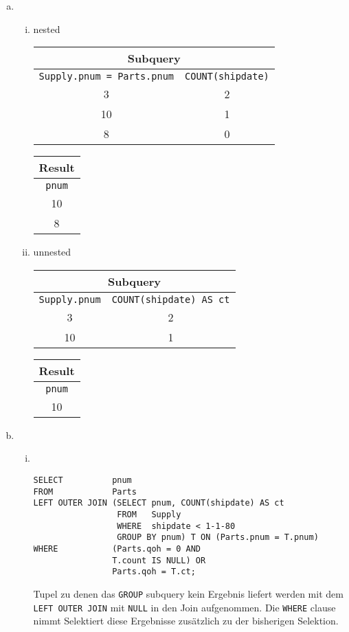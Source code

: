 \documentclass{uni_tue_template}
\newcommand{\code}[1]{\texttt{{\footnotesize #1}}}
\begin{document}
	\begin{enumerate}[(a)]
		\item \hfill\\
		\begin{enumerate}[i.]
			\item nested\\
			\begin{tabular}{|c|c|}
			\multicolumn{2}{c}{\textbf{Subquery}}\\
			\hline
			\code{Supply.pnum = Parts.pnum}&\code{COUNT(shipdate)}\\
			\hline
			3&2\\
			10&1\\
			8&0\\
			\hline
			\end{tabular}
			\begin{tabular}{|c|}
			\multicolumn{1}{c}{\textbf{Result}}\\
			\hline
			\code{pnum}\\
			\hline
			10\\
			8\\
			\hline
			\end{tabular}
			\item unnested\\
			\begin{tabular}{|c|c|}
			\multicolumn{2}{c}{\textbf{Subquery}}\\
			\hline
			\code{Supply.pnum}&\code{COUNT(shipdate) AS ct}\\
			\hline
			3&2\\
			10&1\\
			\hline
			\end{tabular}
			\begin{tabular}{|c|}
			\multicolumn{1}{c}{\textbf{Result}}\\
			\hline
			\code{pnum}\\
			\hline
			10\\
			\hline
			\end{tabular}
		\end{enumerate}
		\item \hfill\\
		\begin{enumerate}[i.]
			\item \hfill\\
\begin{lstlisting}
SELECT          pnum
FROM            Parts
LEFT OUTER JOIN (SELECT pnum, COUNT(shipdate) AS ct
                 FROM   Supply
                 WHERE  shipdate < 1-1-80
                 GROUP BY pnum) T ON (Parts.pnum = T.pnum)
WHERE           (Parts.qoh = 0 AND 
                T.count IS NULL) OR
                Parts.qoh = T.ct;
\end{lstlisting}
		Tupel zu denen das \code{GROUP} subquery kein Ergebnis liefert werden mit dem \code{LEFT OUTER JOIN} mit \code{NULL} in den Join aufgenommen. Die \code{WHERE} clause nimmt Selektiert diese Ergebnisse zusätzlich zu der bisherigen Selektion.
		\end{enumerate}
	\end{enumerate}
\subExEnd{}
\end{document}
